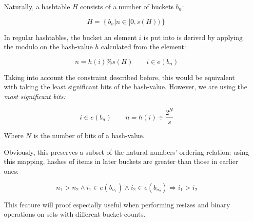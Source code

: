         Naturally, a hashtable $H$ consists of a number of buckets $b_n$:

        \begin{equation}
            H = \left\{ b_n | n \in [0, s(H)) \right\}
        \end{equation}

        In regular hashtables, the bucket an element $i$ is put into is derived
        by applying the modulo on the hash-value $h$ calculated from the
        element:

        \begin{equation}
            n = h(i) \% s(H) \qquad i \in e(b_n)
        \end{equation}

        Taking into account the constraint described before, this would be
        equivalent with taking the least significant bits of the hash-value.
        However, we are using the \em most\em{} significant bits:

        \begin{equation}
            i \in e(b_n) \qquad n = h(i) \div \frac{2^N}{s}
        \end{equation}

        Where $N$ is the number of bits of a hash-value.
        
        Obviously, this preserves a subset of the natural numbers' ordering
        relation: using this mapping, hashes of items in later buckets are
        greater than those in earlier ones:

        \begin{equation}
            n_1 > n_2 \land i_1 \in e(b_{n_1}) \land i_2 \in e(b_{n_2})
            \Rightarrow i_1 > i_2
        \end{equation}

        This feature will proof especially useful when performing resizes and
        binary operations on sets with different bucket-counts.

